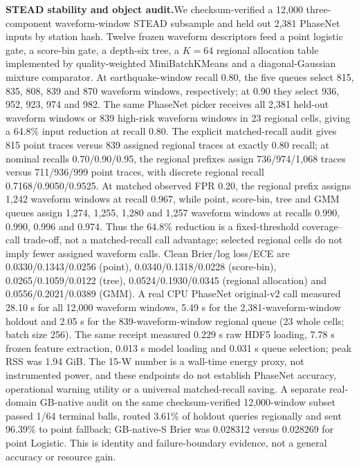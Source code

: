 \documentclass[10pt]{article}
\begin{document}
\textbf{STEAD stability and object audit.}\;We checksum-verified a 12,000 three-component waveform-window STEAD subsample and held out 2,381 PhaseNet inputs by station hash. Twelve frozen waveform descriptors feed a point logistic gate, a score-bin gate, a depth-six tree, a $K=64$ regional allocation table implemented by quality-weighted MiniBatchKMeans and a diagonal-Gaussian mixture comparator. At earthquake-window recall 0.80, the five queues select 815, 835, 808, 839 and 870 waveform windows, respectively; at 0.90 they select 936, 952, 923, 974 and 982. The same PhaseNet picker receives all 2,381 held-out waveform windows or 839 high-risk waveform windows in 23 regional cells, giving a 64.8\% input reduction at recall 0.80. The explicit matched-recall audit gives 815 point traces versus 839 assigned regional traces at exactly 0.80 recall; at nominal recalls 0.70/0.90/0.95, the regional prefixes assign 736/974/1,068 traces versus 711/936/999 point traces, with discrete regional recall 0.7168/0.9050/0.9525. At matched observed FPR 0.20, the regional prefix assigns 1,242 waveform windows at recall 0.967, while point, score-bin, tree and GMM queues assign 1,274, 1,255, 1,280 and 1,257 waveform windows at recalls 0.990, 0.990, 0.996 and 0.974. Thus the 64.8\% reduction is a fixed-threshold coverage--call trade-off, not a matched-recall call advantage; selected regional cells do not imply fewer assigned waveform calls. Clean Brier/log loss/ECE are 0.0330/0.1343/0.0256 (point), 0.0340/0.1318/0.0228 (score-bin), 0.0265/0.1059/0.0122 (tree), 0.0524/0.1930/0.0345 (regional allocation) and 0.0556/0.2021/0.0389 (GMM). A real CPU PhaseNet original-v2 call measured 28.10 s for all 12,000 waveform windows, 5.49 s for the 2,381-waveform-window holdout and 2.05 s for the 839-waveform-window regional queue (23 whole cells; batch size 256). The same receipt measured 0.229 s raw HDF5 loading, 7.78 s frozen feature extraction, 0.013 s model loading and 0.031 s queue selection; peak RSS was 1.94 GiB. The 15-W number is a wall-time energy proxy, not instrumented power, and these endpoints do not establish PhaseNet accuracy, operational warning utility or a universal matched-recall saving. A separate real-domain GB-native audit on the same checksum-verified 12,000-window subset passed 1/64 terminal balls, routed 3.61\% of holdout queries regionally and sent 96.39\% to point fallback; GB-native-S Brier was 0.028312 versus 0.028269 for point Logistic. This is identity and failure-boundary evidence, not a general accuracy or resource gain.
\end{document}
